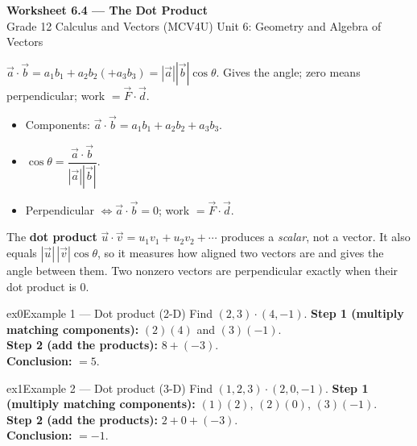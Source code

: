 \documentclass[11pt]{article}
\begin{document}
\begin{center}
{\LARGE\bfseries\color{titleblue}Worksheet 6.4 --- The Dot Product}\\[2pt]
{\small Grade 12 Calculus and Vectors (MCV4U) \textperiodcentered{} Unit 6: Geometry and Algebra of Vectors}
\end{center}

\begin{ideabox}
$\vec a\cdot\vec b=a_1b_1+a_2b_2(+a_3b_3)=|\vec a||\vec b|\cos\theta$. Gives the angle; zero means perpendicular; work $=\vec F\cdot\vec d$.
\begin{itemize}[leftmargin=*,itemsep=2pt]
  \item Components: $\vec a\cdot\vec b=a_1b_1+a_2b_2+a_3b_3$.
  \item $\cos\theta=\dfrac{\vec a\cdot\vec b}{|\vec a||\vec b|}$.
  \item Perpendicular $\iff\vec a\cdot\vec b=0$; work $=\vec F\cdot\vec d$.
\end{itemize}
\end{ideabox}

\begin{learnbox}
The \textbf{dot product} $\vec u\cdot\vec v=u_1v_1+u_2v_2+\cdots$ produces a \emph{scalar}, not a vector.
It also equals $|\vec u|\,|\vec v|\cos\theta$, so it measures how aligned two vectors are and gives the angle between them.
Two nonzero vectors are perpendicular exactly when their dot product is $0$.
\end{learnbox}


\begin{example}{ex0}{Example 1 --- Dot product (2-D)}
Find $(2,3)\cdot(4,-1)$.\soln
\textbf{Step 1 (multiply matching components):} $(2)(4)$ and $(3)(-1)$.\\[3pt]
\textbf{Step 2 (add the products):} $8+(-3)$.\\[3pt]
\textbf{Conclusion:} $=5$.
\end{example}

\begin{example}{ex1}{Example 2 --- Dot product (3-D)}
Find $(1,2,3)\cdot(2,0,-1)$.\soln
\textbf{Step 1 (multiply matching components):} $(1)(2)$, $(2)(0)$, $(3)(-1)$.\\[3pt]
\textbf{Step 2 (add the products):} $2+0+(-3)$.\\[3pt]
\textbf{Conclusion:} $=-1$.
\end{example}
\end{document}
